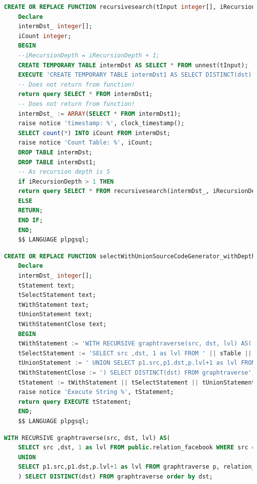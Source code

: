 \newpage
\begin{lstlisting}[language=SQL,caption = Selbstgeschriebenes Stored Procedure,frame=single, label={recursiveFunction} ]
    CREATE OR REPLACE FUNCTION recursivesearch(tInput integer[], iRecursionDepth integer, sTable text) RETURNS SETOF integer AS $$
    Declare
    intermDst_ integer[];
    iCount integer;
    BEGIN
    --iRecursionDepth = iRecursionDepth + 1;
    CREATE TEMPORARY TABLE intermDst AS SELECT * FROM unnest(tInput);
    EXECUTE 'CREATE TEMPORARY TABLE intermDst1 AS SELECT DISTINCT(dst) FROM ' || sTable || ' WHERE src IN (SELECT * FROM intermDst)';
    -- Does not return from function!
    return query SELECT * FROM intermDst1;
    -- Does not return from function!
    intermDst_ := ARRAY(SELECT * FROM intermDst1);
    raise notice 'timestamp: %', clock_timestamp();
    SELECT count(*) INTO iCount FROM intermDst;
    raise notice 'Count Table: %', iCount;
    DROP TABLE intermDst;
    DROP TABLE intermDst1;
    -- As recursion depth is 5
    if iRecursionDepth > 1 THEN
    return query SELECT * FROM recursivesearch(intermDst_, iRecursionDepth - 1, sTable);
    ELSE
    RETURN;
    END IF;
    END;
    $$ LANGUAGE plpgsql;
\end{lstlisting}

\begin{lstlisting}[language=SQL,caption = SQL Standard Generisch,frame=single, label={StandardSQLGenerisch} ]
    CREATE OR REPLACE FUNCTION selectWithUnionSourceCodeGenerator_withDepth(sTable text, startingNode integer, depth integer ) RETURNS SETOF integer AS $$
    Declare
    intermDst_ integer[];
    tStatement text;
    tSelectStatement text;
    tWithStatement text;
    tUnionStatement text;
    tWithStatementClose text;
    BEGIN
    tWithStatement := 'WITH RECURSIVE graphtraverse(src, dst, lvl) AS(';
    tSelectStatement := 'SELECT src ,dst, 1 as lvl FROM ' || sTable || ' WHERE src ='||startingNode;
    tUnionStatement := ' UNION SELECT p1.src,p1.dst,p.lvl+1 as lvl FROM graphtraverse p, ' || sTable || ' p1 WHERE p1.src IN ( p.dst ) and lvl<'||depth;
    tWithStatementClose := ') SELECT DISTINCT(dst) FROM graphtraverse';
    tStatement := tWithStatement || tSelectStatement || tUnionStatement || tWithStatementClose;
    raise notice 'Execute String %', tStatement;
    return query EXECUTE tStatement;
    END;
    $$ LANGUAGE plpgsql;
\end{lstlisting}

\begin{lstlisting}[language=SQL,caption = SQL Standard,frame=single, label={StandardSQL} ]
    WITH RECURSIVE graphtraverse(src, dst, lvl) AS(
    SELECT src ,dst, 1 as lvl FROM public.relation_facebook WHERE src =765
    UNION
    SELECT p1.src,p1.dst,p.lvl+1 as lvl FROM graphtraverse p, relation_facebook p1 WHERE p1.src IN ( p.dst ) and lvl<5
    ) SELECT DISTINCT(dst) FROM graphtraverse order by dst;
\end{lstlisting}

